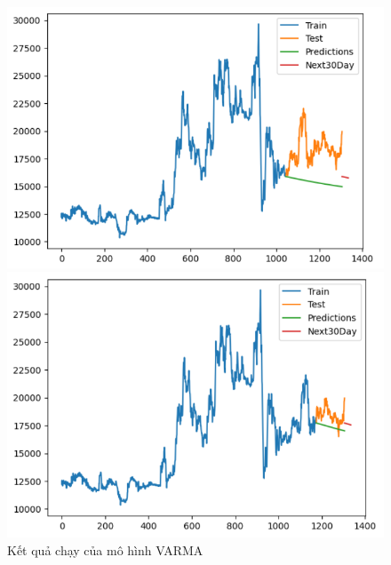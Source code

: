 \begin{figure}[H]
\begin{minipage}{0.15\textwidth}
    \includegraphics[width=1\textwidth]{resources/chapter-5/newdata/result/EIB_VARMA_8-2.png}
    \end{minipage}
    \hfill
        \begin{minipage}{0.15\textwidth}
    \centering
    \includegraphics[width=1\textwidth]{resources/chapter-5/newdata/result/EIB_VARMA_9-1.png}
    \end{minipage}
    \hfill
    
    \caption{Kết quả chạy của mô hình VARMA}
    \label{fig:varma_result}
\end{figure}


